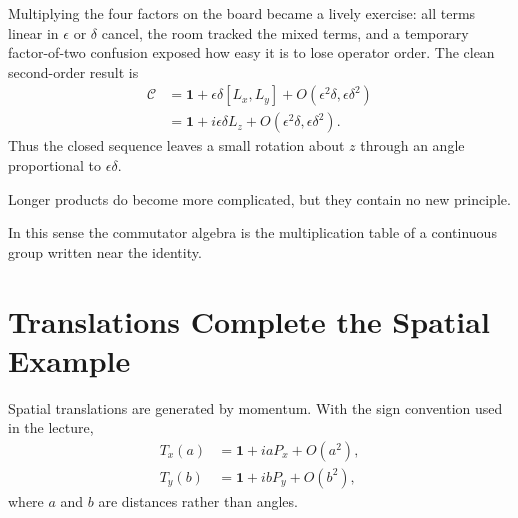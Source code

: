 Multiplying the four factors on the board became a lively exercise: all terms linear in \(\epsilon\) or \(\delta\) cancel, the room tracked the mixed terms, and a temporary factor-of-two confusion exposed how easy it is to lose operator order. The clean second-order result is
\begin{align}
\mathcal C
&=\mathbf 1+\epsilon\delta[L_x,L_y]
  +O(\epsilon^2\delta,\epsilon\delta^2)\\
&=\mathbf 1+i\epsilon\delta L_z
  +O(\epsilon^2\delta,\epsilon\delta^2).
\end{align}
Thus the closed sequence leaves a small rotation about \(z\) through an angle proportional to \(\epsilon\delta\). 

\begin{classroomqa}
\end{classroomqa}

Longer products do become more complicated, but they contain no new principle.

\begin{classroomqa}
\end{classroomqa}

In this sense the commutator algebra is the multiplication table of a continuous group written near the identity.

\section{Translations Complete the Spatial Example}

Spatial translations are generated by momentum. With the sign convention used in the lecture,
\begin{equation}
\begin{aligned}
T_x(a)&=\mathbf 1+iaP_x+O(a^2),\\
T_y(b)&=\mathbf 1+ibP_y+O(b^2),
\end{aligned}
\end{equation}
where \(a\) and \(b\) are distances rather than angles.

